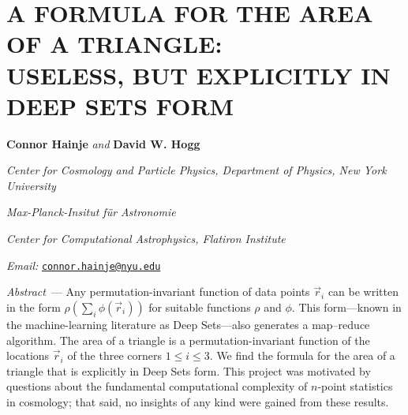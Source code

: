 \documentclass[10pt]{article}
\renewcommand{\paragraph}[1]{\par\addvspace{1.5ex}\noindent\textsl{#1}~---}
\newcommand{\aOne}{\textsuperscript{\textasteriskcentered}}
\newcommand{\aTwo}{\textsuperscript{\textdagger}}
\newcommand{\aThree}{\textsuperscript{\textdaggerdbl}}
\newcommand{\aFour}{\textsuperscript{\textsection}}
\newcommand{\aFive}{\textsuperscript{\textbardbl}}
\newcommand{\aSix}{\textsuperscript{\textparagraph}}
\begin{document}
\thispagestyle{empty}\setcounter{secnumdepth}{0}

\section*{\centering\normalsize\uppercase{
A formula for the area of a triangle:\\
Useless, but explicitly in Deep Sets form}}

\medskip
\noindent
\textbf{Connor Hainje}\aOne\aSix{}
\textsl{and}
\textbf{David W. Hogg}\aOne\aTwo\aThree%

\medskip
{\footnotesize\par\noindent \aOne\textsl{
Center for Cosmology and Particle Physics, Department of Physics, New York University}}
{\footnotesize\par\noindent \aTwo\textsl{
Max-Planck-Insitut f\"ur Astronomie}}
{\footnotesize\par\noindent \aThree\textsl{
Center for Computational Astrophysics, Flatiron Institute}}
{\footnotesize\par\noindent \aSix\textsl{
Email:} \texttt{\href{mailto:connor.hainje@nyu.edu}{connor.hainje@nyu.edu}}}
{\footnotesize\par}  %

\medskip
\paragraph{Abstract}
Any permutation-invariant function of data points $\vec{r}_i$
can be written in the form $\rho(\sum_i\phi(\vec{r}_i))$ for suitable functions $\rho$ and $\phi$.
This form---known in the machine-learning literature as Deep Sets---also generates a map--reduce algorithm.
The area of a triangle is a permutation-invariant function of the locations $\vec{r}_i$ of the three corners $1\leq i\leq 3$.
We find the formula for the area of a triangle that is explicitly in Deep Sets form.
This project was motivated by questions about the fundamental computational complexity of $n$-point statistics in cosmology; that said, no insights of any kind were gained from these results.
\end{document}
